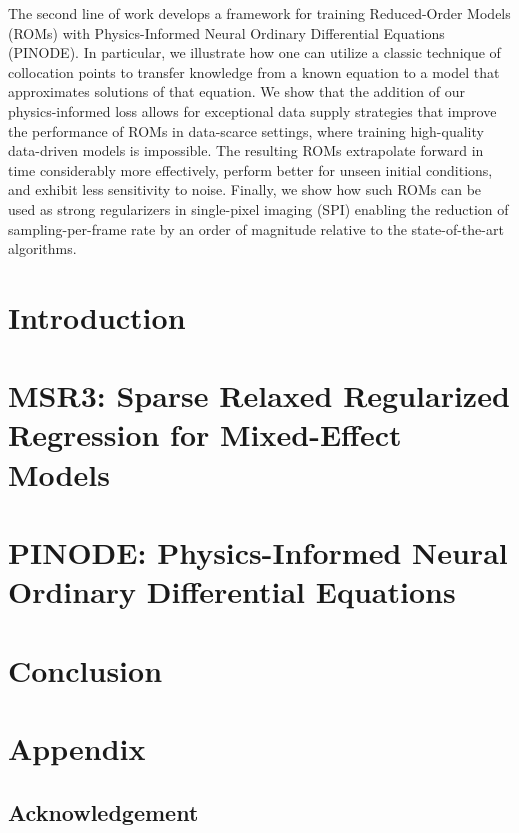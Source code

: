\documentclass[12pt,a4paper]{book}
\numberwithin{equation}{section} %
\numberwithin{figure}{section} %
\numberwithin{table}{section} %
\begin{document}
The second line of work develops a framework for training Reduced-Order Models (ROMs) with Physics-Informed Neural Ordinary Differential Equations (PINODE). In particular, we illustrate how one can utilize a classic technique of collocation points to transfer knowledge from a known equation to a model that approximates solutions of that equation. We show that the addition of our physics-informed loss allows for exceptional data supply strategies that improve the performance of ROMs in data-scarce settings, where training high-quality data-driven models is impossible. The resulting ROMs extrapolate forward in time considerably more effectively,  perform better for unseen initial conditions, and exhibit less sensitivity to noise. Finally, we show how such ROMs can be used as strong regularizers in single-pixel imaging (SPI) enabling the reduction of sampling-per-frame rate by an order of magnitude relative to the state-of-the-art algorithms.

\tableofcontents

\chapter{Introduction}


\chapter{MSR3: Sparse Relaxed Regularized Regression for Mixed-Effect Models}
\label{ch:msr3}


\chapter{PINODE: Physics-Informed Neural Ordinary Differential Equations}
\label{ch:pinode}




\chapter{Conclusion}





\clearpage

\appendix
\chapter{Appendix}
\section{Acknowledgement}

\end{document}
